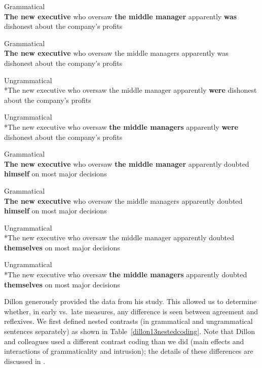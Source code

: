 \documentclass{cambridge7A}\usepackage[]{graphicx}\usepackage[]{color}
\begin{document}
\begin{exe}
\ex \label{dillon13agrmt}
\begin{xlist}
\item Grammatical \\
\textbf{The new executive} who oversaw \textbf{the middle manager} apparently \textbf{was} dishonest about the company's profits
\item Grammatical \\
\textbf{The new executive} who oversaw the middle managers apparently was dishonest about the company's profits
\item Ungrammatical \\
*The new executive who oversaw the middle manager apparently \textbf{were} dishonest about the company's profits
\item  Ungrammatical \\
*The new executive who oversaw \textbf{the middle managers} apparently \textbf{were} dishonest about the company's profits
\end{xlist}
\end{exe}



\begin{exe}
\ex \label{dillon13refl}
\begin{xlist}
\item 
Grammatical \\
\textbf{The new executive} who oversaw \textbf{the middle manager} apparently doubted \textbf{himself} on most major decisions
\item
Grammatical\\ 
\textbf{The new executive} who oversaw the middle managers apparently doubted \textbf{himself} on most major decisions
\item
Ungrammatical \\
*The new executive who oversaw the middle manager apparently doubted \textbf{themselves} on most major decisions
\item 
Ungrammatical \\
*The new executive who oversaw \textbf{the middle managers} apparently doubted \textbf{themselves} on most major decisions
\end{xlist}
\end{exe}

Dillon generously provided the data from his study. This allowed us to  determine whether, in early vs.\ late measures, any difference is seen between agreement and reflexives. We first defined nested contrasts (in grammatical and ungrammatical sentences separately) as shown in Table~\ref{dillon13nestedcoding}. Note that Dillon and colleagues used a different contrast coding than we did (main effects and interactions of grammaticality and intrusion); the details of these differences are discussed in \cite{JaegerMertzenVanDykeVasishth2019}. 
\end{document}
